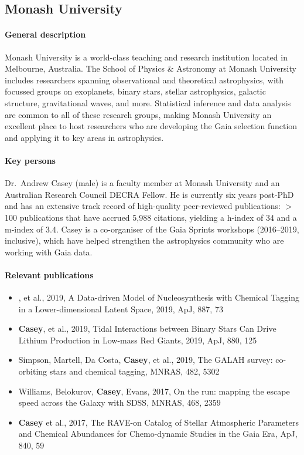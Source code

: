 \subsection{Monash University}
\label{sec:mona}

\paragraph{General description}
Monash University is a world-class teaching and research institution located in Melbourne, Australia. The School of Physics \& Astronomy at Monash University includes researchers spanning observational and theoretical astrophysics, with focussed groups on exoplanets, binary stars, stellar astrophysics, galactic structure, gravitational waves, and more. Statistical inference and data analysis are common to all of these research groups, making Monash University an excellent place to host researchers who are developing the Gaia selection function and applying it to key areas in astrophysics.

\paragraph{Key persons}
Dr.~Andrew Casey (male) is a faculty member at Monash University and an Australian Research Council DECRA Fellow. He is currently six years post-PhD and has an extensive track record of high-quality peer-reviewed publications: $>$100 publications that have accrued 5,988 citations, yielding a h-index of 34 and a m-index of 3.4. Casey is a co-organiser of the Gaia Sprints workshops (2016--2019, inclusive), which have helped strengthen the astrophysics community who are working with Gaia data.


\paragraph{Relevant publications}
\begin{itemize}
	\item {}, et al., 2019, A Data-driven Model of Nucleosynthesis with Chemical Tagging in a Lower-dimensional Latent Space, 2019, ApJ, 887, 73
	\item \textbf{Casey}, et al., 2019, Tidal Interactions between Binary Stars Can Drive Lithium Production in Low-mass Red Giants, 2019, ApJ, 880, 125
	\item Simpson, Martell, Da Costa, \textbf{Casey}, et al., 2019, The GALAH survey: co-orbiting stars and chemical tagging, MNRAS, 482, 5302
	\item Williams, Belokurov, \textbf{Casey}, Evans, 2017, On the run: mapping the escape speed across the Galaxy with SDSS, MNRAS, 468, 2359
	\item \textbf{Casey} et al., 2017, The RAVE-on Catalog of Stellar Atmospheric Parameters and Chemical Abundances for Chemo-dynamic Studies in the Gaia Era, ApJ, 840, 59
\end{itemize}

